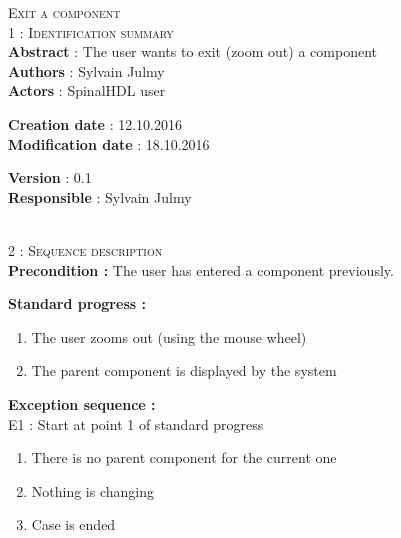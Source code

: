 \begin{flushleft}
    \textsc{\huge Exit a component}\\[0.5cm]

    \BlackLine
    \textsc{\Large 1 : Identification summary}\\[0.3cm]

        \textbf{\large Abstract} : The user wants to exit (zoom out) a component\\[0.1cm]

        \textbf{\large Authors} : Sylvain Julmy \\[0.3cm]			

        \textbf{\large Actors} : SpinalHDL user \\[0.1cm]	
    \begin{minipage}{0.40\textwidth}
        \begin{flushleft}	
            \textbf{\large Creation date} : 12.10.2016 \\[0.1cm]

            \textbf{\large Modification date} : 18.10.2016 \\[0.1cm]
        \end{flushleft}
    \end{minipage}
    \begin{minipage}{0.40\textwidth}
        \begin{flushleft}
            \textbf{\large Version} : 0.1 \\[0.1cm]

            \textbf{\large Responsible} : Sylvain Julmy \\[0.1cm]
        \end{flushleft}
    \end{minipage}
    \\[0.5cm]
    \BlackLine
    \textsc{\Large 2 : Sequence description}\\[0.3cm]

    \textbf{\large Precondition :} The user has entered a component previously.

    \textbf{\large  Standard progress :}
    \begin{enumerate}[nosep]
        \item The user zooms out (using the mouse wheel)
        \item The parent component is displayed by the system
    \end{enumerate}

    \textbf{\large  Exception sequence :}\\
    E1 : Start at point 1 of standard progress
    \begin{enumerate}[nosep]
        \item There is no parent component for the current one
        \item Nothing is changing
        \item Case is ended
    \end{enumerate}
    

\end{flushleft}
